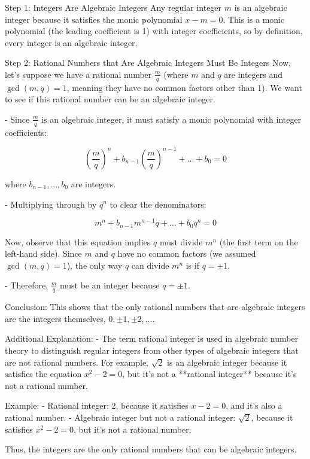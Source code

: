 \documentclass{article}
\newenvironment{proofbox}
  {\begin{mdframed}[linewidth=1pt,linecolor=black,backgroundcolor=white]\noindent\ignorespaces}
  {\end{mdframed}}
\begin{document}
\begin{proofbox}
   Step 1: Integers Are Algebraic Integers
    Any regular integer \( m \) is an algebraic integer because it satisfies the monic polynomial \( x - m = 0 \). This is a monic polynomial (the leading coefficient is 1) with integer coefficients, so by definition, every integer is an algebraic integer.
    
   Step 2: Rational Numbers that Are Algebraic Integers Must Be Integers
    Now, let’s suppose we have a rational number \( \frac{m}{q} \) (where \( m \) and \( q \) are integers and \( \gcd(m, q) = 1 \), meaning they have no common factors other than 1). We want to see if this rational number can be an algebraic integer.
    
    - Since \( \frac{m}{q} \) is an algebraic integer, it must satisfy a monic polynomial with integer coefficients:
    
    \[
    \left( \frac{m}{q} \right)^n + b_{n-1} \left( \frac{m}{q} \right)^{n-1} + \dots + b_0 = 0
    \]
    
    where \( b_{n-1}, \dots, b_0 \) are integers. 
    
    - Multiplying through by \( q^n \) to clear the denominators:
    
    \[
    m^n + b_{n-1} m^{n-1} q + \dots + b_0 q^n = 0
    \]
    
    Now, observe that this equation implies \( q \) must divide \( m^n \) (the first term on the left-hand side). Since \( m \) and \( q \) have no common factors (we assumed \( \gcd(m, q) = 1 \)), the only way \( q \) can divide \( m^n \) is if \( q = \pm 1 \).
    
    - Therefore, \( \frac{m}{q} \) must be an integer because \( q = \pm 1 \).
    
    Conclusion:
    This shows that the only rational numbers that are algebraic integers are the integers themselves, \( 0, \pm 1, \pm 2, \dots \).
    
    Additional Explanation:
    - The term rational integer is used in algebraic number theory to distinguish regular integers from other types of algebraic integers that are not rational numbers. For example, \( \sqrt{2} \) is an algebraic integer because it satisfies the equation \( x^2 - 2 = 0 \), but it’s not a **rational integer** because it’s not a rational number.
    
     Example:
    - Rational integer: 2, because it satisfies \( x - 2 = 0 \), and it’s also a rational number.
    - Algebraic integer but not a rational integer: \( \sqrt{2} \), because it satisfies \( x^2 - 2 = 0 \), but it’s not a rational number.
    
    Thus, the integers are the only rational numbers that can be algebraic integers.
\end{proofbox}
\end{document}
